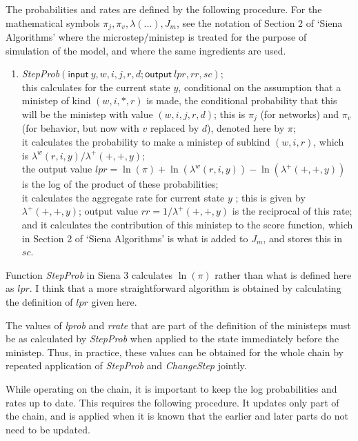 \documentclass[a4paper,fleqn,12pt]{article}
\begin{document}
The probabilities and rates are defined by the following procedure.
For the mathematical symbols $\pi_j, \pi_v, \lambda(...), J_m$, see
the notation of Section 2 of `Siena Algorithms' where the microstep/ministep
is treated for the purpose of simulation of the model,
and where the same ingredients are used.
\begin{enumerate}
\item \textit{StepProb}$(\textsf{input}\ y, w,i,j,r,d; \textsf{output}\ lpr, rr, sc)$;\\
      this calculates for the current state $y$, conditional on the
      assumption that a ministep of kind $(w,i,*,r)$ is made,
      the conditional probability that this will be the ministep
      with value $(w,i,j,r,d)$;
      this is $\pi_j$ (for networks) and $\pi_v$ (for behavior,
      but now with $v$ replaced by $d$), denoted here by $\pi$;\\
      it calculates the probability to make
      a ministep of subkind $(w,i,r)$, which is
      $\lambda^w(r,i,y) / \lambda^+(+,+,y)$;\\
      the output value
      $lpr = \ln(\pi) + \ln(\lambda^w(r,i,y)) - \ln(\lambda^+(+,+,y))$
      is the log of the product of these probabilities;\\
      it calculates the aggregate rate for current state $y$ ;
      this is given by $\lambda^+(+,+,y)$; output value
      $rr = 1/\lambda^+(+,+,y)$ is the reciprocal of this rate;\\
      and it calculates the contribution of this ministep to the
      score function, which in Section 2 of `Siena Algorithms'
      is what is added to $J_m$, and stores this in $sc$.
\end{enumerate}
Function \textit{StepProb} in Siena 3 calculates $\ln(\pi)$ rather than what
is defined here as $lpr$. I think that a more straightforward algorithm
is obtained by calculating the definition of $lpr$ given here.

The values of \textit{lprob} and \textit{rrate} that are part of the definition
of the ministeps must be as calculated by \textit{StepProb} when applied to the
state immediately before the ministep.
Thus, in practice, these values can be obtained for the whole chain
by repeated application of \textit{StepProb} and \textit{ChangeStep} jointly.

While operating on the chain, it is important to keep the
log probabilities and rates up to date. This requires the following procedure.
It updates only part of the chain, and is applied when it is known
that the earlier and later parts do not need to be updated.
\end{document}
